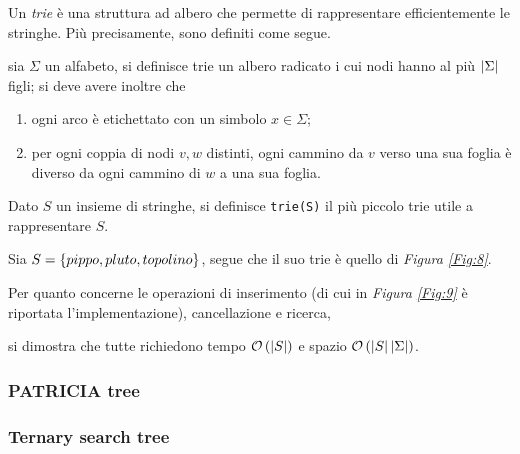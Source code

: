 \documentclass{subfiles}
\begin{document}
Un \emph{trie} è una struttura ad albero che permette di rappresentare efficientemente le stringhe.
Più precisamente, sono definiti come segue.

\begin{Definition*}
    sia \(\Sigma\) un alfabeto, si definisce trie un albero radicato i cui nodi hanno al più \(\left\vert {\Sigma} \right\vert\) figli;
    si deve avere inoltre che
    \begin{enumerate}
        \item ogni arco è etichettato con un simbolo \(x \in \Sigma\);
        \item per ogni coppia di nodi \(v, w\) distinti, ogni cammino da \(v\) verso una sua foglia è diverso da ogni cammino di \(w\) a una sua foglia.
    \end{enumerate}

    \noindent Dato \(S\) un insieme di stringhe, si definisce \lstinline[language = PSEUDO]{trie(S)} il più piccolo trie utile a rappresentare \(S\).
\end{Definition*}

\begin{Example*}
    Sia \(S = \Set{pippo, pluto, topolino}\), segue che il suo trie è quello di \emph{Figura \ref{Fig:8}}.
    
\end{Example*}

Per quanto concerne le operazioni di inserimento (di cui in \emph{Figura \ref{Fig:9}} è riportata l'implementazione), cancellazione e ricerca,

si dimostra che tutte richiedono tempo \(\operatorname{\mathcal{O}} \left(\left\vert {S} \right\vert\right)\) e spazio \(\operatorname{\mathcal{O}} \left(\left\vert {S} \right\vert\left\vert {\Sigma} \right\vert\right)\).

\subsubsection{PATRICIA tree}


\subsubsection{Ternary search tree}

\end{document}
